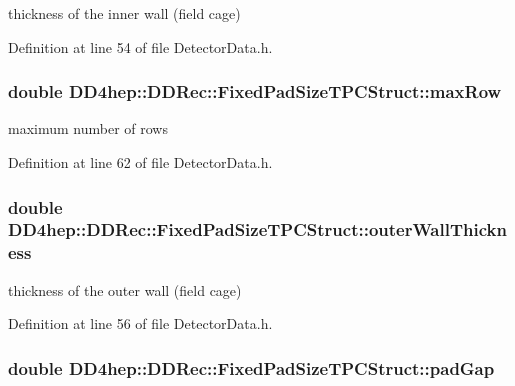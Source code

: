 thickness of the inner wall (field cage) 

Definition at line 54 of file DetectorData.h.\hypertarget{struct_d_d4hep_1_1_d_d_rec_1_1_fixed_pad_size_t_p_c_struct_acb713c655ac777ede8f3c951f4f83a1e}{
\subsubsection[{maxRow}]{\setlength{\rightskip}{0pt plus 5cm}double {\bf DD4hep::DDRec::FixedPadSizeTPCStruct::maxRow}}}
\label{struct_d_d4hep_1_1_d_d_rec_1_1_fixed_pad_size_t_p_c_struct_acb713c655ac777ede8f3c951f4f83a1e}


maximum number of rows 

Definition at line 62 of file DetectorData.h.\hypertarget{struct_d_d4hep_1_1_d_d_rec_1_1_fixed_pad_size_t_p_c_struct_aafd297bbbf6703fe145eadc4eeaa38fc}{
\subsubsection[{outerWallThickness}]{\setlength{\rightskip}{0pt plus 5cm}double {\bf DD4hep::DDRec::FixedPadSizeTPCStruct::outerWallThickness}}}
\label{struct_d_d4hep_1_1_d_d_rec_1_1_fixed_pad_size_t_p_c_struct_aafd297bbbf6703fe145eadc4eeaa38fc}


thickness of the outer wall (field cage) 

Definition at line 56 of file DetectorData.h.\hypertarget{struct_d_d4hep_1_1_d_d_rec_1_1_fixed_pad_size_t_p_c_struct_a28e26e987689e132b295e84586133520}{
\subsubsection[{padGap}]{\setlength{\rightskip}{0pt plus 5cm}double {\bf DD4hep::DDRec::FixedPadSizeTPCStruct::padGap}}}
\label{struct_d_d4hep_1_1_d_d_rec_1_1_fixed_pad_size_t_p_c_struct_a28e26e987689e132b295e84586133520}


